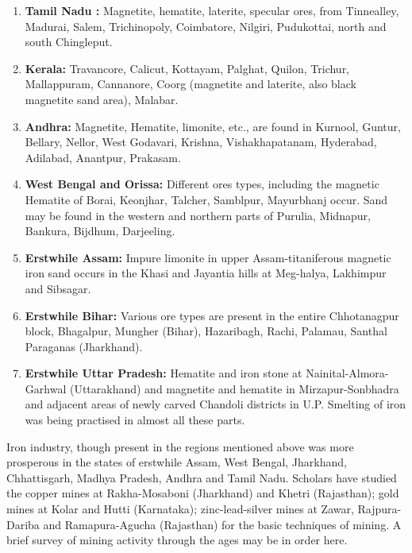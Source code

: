 \begin{enumerate}
\item {\bf Tamil Nadu :} Magnetite, hematite, laterite, specular ores, from Tinnealley, Madurai, Salem, Trichinopoly, Coimbatore, Nilgiri, Pudukottai, north and south Chingleput.
\item {\bf Kerala:} Travancore, Calicut, Kottayam, Palghat, Quilon, Trichur, Mallappuram, Cannanore, Coorg (magnetite and laterite, also black magnetite sand area), Malabar.
\item {\bf Andhra:} Magnetite, Hematite, limonite, etc., are found in Kurnool, Guntur, Bellary, Nellor, West Godavari, Krishna, Vishakhapatanam, Hyderabad, Adilabad, Anantpur, Prakasam.
\item {\bf West Bengal and Orissa:} Different ores types, including the magnetic Hematite of Borai, Keonjhar, Talcher, Samblpur, Mayurbhanj occur. Sand may be found in the western and northern parts of Purulia, Midnapur, Bankura, Bijdhum, Darjeeling.
\item {\bf Erstwhile Assam:} Impure limonite in upper Assam-titaniferous magnetic iron sand occurs in the Khasi and Jayantia hills at Meg-\break halya, Lakhimpur and Sibsagar.
\item {\bf Erstwhile Bihar:} Various ore types are present in the entire Chhotanagpur block, Bhagalpur, Mungher (Bihar), Hazaribagh, Rachi, Palamau, Santhal Paraganas (Jharkhand).
\item {\bf Erstwhile Uttar Pradesh:} Hematite and iron stone at Nainital-Almora-Garhwal (Uttarakhand) and magnetite and hematite in Mirzapur-Sonbhadra and adjacent areas of newly carved Chandoli districts in U.P. Smelting of iron was being practised in almost all these parts.
\end{enumerate}

\vspace{-.2cm}

Iron industry, though present in the regions mentioned above was more prosperous in the states of erstwhile Assam, West Bengal, Jharkhand, Chhattisgarh, Madhya Pradesh, Andhra and Tamil Nadu. Scholars have studied the copper mines at Rakha-Mosaboni (Jharkhand) and Khetri (Rajasthan); gold mines at Kolar and Hutti (Karnataka); zinc-lead-silver mines at Zawar, Rajpura-Dariba and Ramapura-Agucha (Rajasthan) for the basic techniques of mining. A brief survey of mining activity through the ages may be in order here.  

